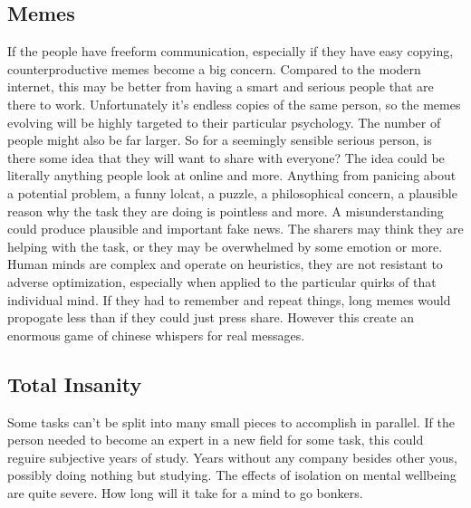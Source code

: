 \documentclass[12pt]{article}
\begin{document}
\subsection{Memes}
If the people have freeform communication, especially if they have easy copying, counterproductive memes become a big concern. Compared to the modern internet, this may be better from having a smart and serious people that are there to work. Unfortunately it's endless copies of the same person, so the memes evolving will be highly targeted to their particular psychology. The number of people might also be far larger. So for a seemingly sensible serious person, is there some idea that they will want to share with everyone? The idea could be literally anything people look at online and more. Anything from panicing about a potential problem, a funny lolcat, a puzzle, a philosophical concern, a plausible reason why the task they are doing is pointless and more. A misunderstanding could produce plausible and important fake news. The sharers may think they are helping with the task, or they may be overwhelmed by some emotion or more. Human minds are complex and operate on heuristics, they are not resistant to adverse optimization, especially when applied to the particular quirks of that individual mind. If they had to remember and repeat things, long memes would propogate less than if they could just press share. However this create an enormous game of chinese whispers for real messages. 
\subsection{Total Insanity}
Some tasks can't be split into many small pieces to accomplish in parallel. If the person needed to become an expert in a new field for some task, this could reguire subjective years of study. Years without any company besides other yous, possibly doing nothing but studying. The effects of isolation on mental wellbeing are quite severe. How long will it take for a mind to go bonkers.
 
\end{document}
